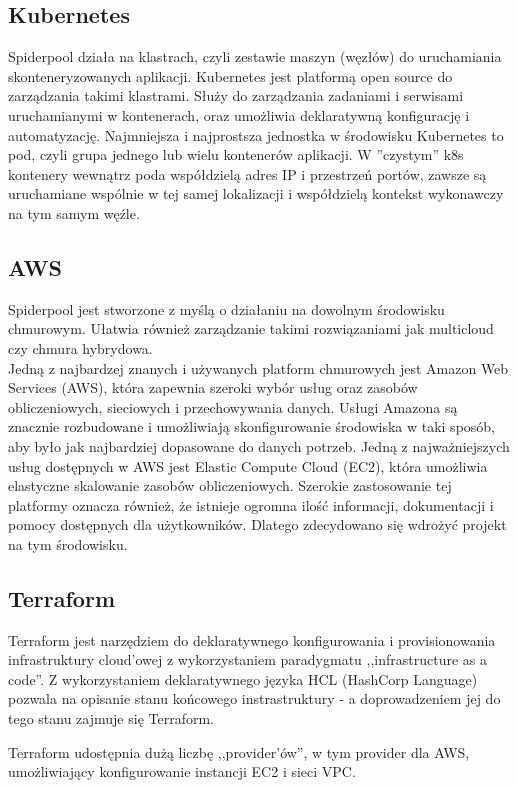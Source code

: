 \documentclass[onecolumn,12pt]{article}
\begin{document}
\subsection{Kubernetes}
Spiderpool działa na klastrach, czyli zestawie maszyn (węzłów) do uruchamiania skonteneryzowanych aplikacji. Kubernetes jest platformą open source do zarządzania takimi klastrami. Służy do zarządzania zadaniami i serwisami uruchamianymi w kontenerach, oraz umożliwia deklaratywną konfigurację i automatyzację. Najmniejsza i najprostsza jednostka w środowisku Kubernetes to pod, czyli grupa jednego lub wielu kontenerów aplikacji. 
W ''czystym'' k8s kontenery wewnątrz poda współdzielą adres IP i przestrzeń portów, zawsze są uruchamiane wspólnie w tej samej lokalizacji i współdzielą kontekst wykonawczy na tym samym węźle.

\subsection{AWS}
Spiderpool jest stworzone z myślą o działaniu na dowolnym środowisku chmurowym. Ułatwia również zarządzanie takimi rozwiązaniami jak multicloud czy chmura hybrydowa.\\
Jedną z najbardzej znanych i używanych platform chmurowych jest Amazon Web Services (AWS), która zapewnia szeroki wybór usług oraz zasobów obliczeniowych, sieciowych i przechowywania danych. Usługi Amazona są znacznie  rozbudowane i umożliwiają skonfigurowanie środowiska w taki sposób, aby było jak najbardziej dopasowane do danych potrzeb. Jedną z najważniejszych usług dostępnych w AWS jest Elastic Compute Cloud (EC2), która umożliwia elastyczne skalowanie zasobów obliczeniowych. Szerokie zastosowanie tej platformy oznacza również, że istnieje ogromna ilość informacji, dokumentacji i pomocy dostępnych dla użytkowników. Dlatego zdecydowano się wdrożyć projekt na tym środowisku.

\subsection{Terraform}
Terraform jest narzędziem do deklaratywnego konfigurowania i provisionowania infrastruktury cloud'owej z wykorzystaniem paradygmatu ,,infrastructure as a code''.
Z wykorzystaniem deklaratywnego języka HCL (HashCorp Language) pozwala na opisanie stanu końcowego instrastruktury - a doprowadzeniem jej do tego stanu zajmuje się Terraform. 

Terraform udostępnia dużą liczbę ,,provider'ów'', w tym provider dla AWS, umożliwiający konfigurowanie instancji EC2 i sieci VPC.
\end{document}
